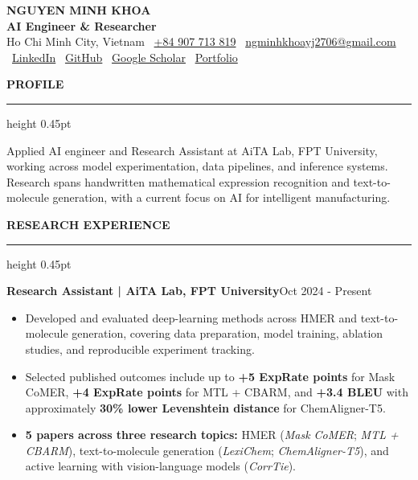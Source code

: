 \documentclass[10pt]{article}
\newcommand{\cvsection}[1]{%
    \vspace{6.2pt}%
    {\color{accent}\bfseries\small #1}\par
    \vspace{2.3pt}%
    {\color{rulegray}\hrule height 0.45pt}\vspace{4.0pt}%
}
\newcommand{\entry}[2]{%
    \textbf{#1}\hfill {\color{muted}\small #2}\par
}
\begin{document}
\begin{center}
    {\LARGE\textbf{NGUYEN MINH KHOA}}\\[-1pt]
    {\color{accent}\textbf{AI Engineer \& Researcher}}\\[3pt]
    {\small Ho Chi Minh City, Vietnam \textbullet\
    \href{tel:+84907713819}{+84 907 713 819} \textbullet\
    \href{mailto:ngminhkhoayj2706@gmail.com}{ngminhkhoayj2706@gmail.com} \textbullet\
    \href{https://www.linkedin.com/in/ngminhkhoa1410}{LinkedIn} \textbullet\
    \href{https://github.com/Purin1410}{GitHub} \textbullet\
    \href{https://scholar.google.com/citations?user=tCq7yoQAAAAJ}{Google Scholar} \textbullet\
    \href{https://purin1410.github.io}{Portfolio}}
\end{center}

\vspace{-2pt}

\cvsection{PROFILE}
Applied AI engineer and Research Assistant at AiTA Lab, FPT University, working across model experimentation, data pipelines, and inference systems. Research spans handwritten mathematical expression recognition and text-to-molecule generation, with a current focus on AI for intelligent manufacturing.

\cvsection{RESEARCH EXPERIENCE}
\entry{Research Assistant | AiTA Lab, FPT University}{Oct 2024 - Present}
\begin{itemize}
    \item Developed and evaluated deep-learning methods across HMER and text-to-molecule generation, covering data preparation, model training, ablation studies, and reproducible experiment tracking.
    \item Selected published outcomes include up to \textbf{+5 ExpRate points} for Mask CoMER, \textbf{+4 ExpRate points} for MTL + CBARM, and \textbf{+3.4 BLEU} with approximately \textbf{30\% lower Levenshtein distance} for ChemAligner-T5.
    \item \textbf{5 papers across three research topics:} HMER (\textit{Mask CoMER}; \textit{MTL + CBARM}), text-to-molecule generation (\textit{LexiChem}; \textit{ChemAligner-T5}), and active learning with vision-language models (\textit{CorrTie}).
\end{itemize}
\end{document}
